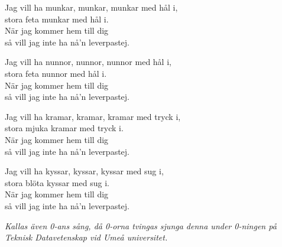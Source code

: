 \vspace{10pt}
Jag vill ha munkar, munkar, munkar med hål i,\\
stora feta munkar med hål i.\\
När jag kommer hem till dig\\
så vill jag inte ha nå'n leverpastej.\par
\vspace{10pt}
Jag vill ha nunnor, nunnor, nunnor med hål i,\\
stora feta nunnor med hål i.\\
När jag kommer hem till dig\\
så vill jag inte ha nå'n leverpastej.\par
\vspace{10pt}
Jag vill ha kramar, kramar, kramar med tryck i,\\
stora mjuka kramar med tryck i.\\
När jag kommer hem till dig\\
så vill jag inte ha nå'n leverpastej.\par
\vspace{10pt}
Jag vill ha kyssar, kyssar, kyssar med sug i,\\
stora blöta kyssar med sug i.\\
När jag kommer hem till dig\\
så vill jag inte ha nå'n leverpastej.\par
\vspace{10pt}
{\footnotesize\textit{Kallas även 0-ans sång, då 0-orna tvingas sjunga denna under 0-ningen på Teknisk Datavetenskap vid Umeå universitet.}}
